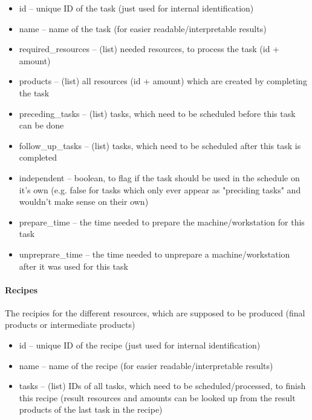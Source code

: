 \documentclass[a4paper,12pt,twoside]{scrreprt}
\begin{document}
\begin{itemize}
	\item id – unique ID of the task (just used for internal identification)
	\item name – name of the task (for easier readable/interpretable results)
	\item required\_resources – (list) needed resources, to process the task (id + amount)
	\item products – (list) all resources (id + amount) which are created by completing the task
	\item preceding\_tasks – (list) tasks, which need to be scheduled before this task can be done
	\item follow\_up\_tasks – (list) tasks, which need to be scheduled after this task is completed
	\item independent – boolean, to flag if the task should be used in the schedule on it's own (e.g. false for tasks which only ever appear as "preciding tasks" and wouldn't make sense on their own)
	\item prepare\_time – the time needed to prepare the machine/workstation for this task
	\item unpreprare\_time – the time needed to unprepare a machine/workstation after it was used for this task
\end{itemize}
\paragraph{Recipes}
The recipies for the different resources, which are supposed to be produced (final products or intermediate products)
\begin{itemize}
	\item id – unique ID of the recipe (just used for internal identification)
	\item name – name of the recipe (for easier readable/interpretable results)
	\item tasks – (list) IDs of all tasks, which need to be scheduled/processed, to finish this recipe (result resources and amounts can be looked up from the result products of the last task in the recipe)
\end{itemize}
\end{document}
